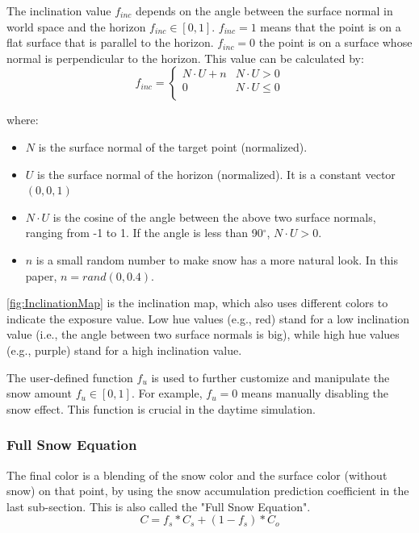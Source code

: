 \documentclass{article}
\begin{document}
The inclination value \( f_{inc} \) depends on the angle between the surface normal in world space and the
horizon \( f_{inc} \in [0, 1] \). \( f_{inc}=1 \) means that the point is on a flat surface that is parallel 
to the horizon. \( f_{inc}=0 \) the point is on a surface whose normal is perpendicular to the horizon. This
value can be calculated by:
\[
  f_{inc}=
  \left\{
    \begin{array}{ll}
      N \cdot U + n & N \cdot U > 0 \\
      0 & N \cdot U \leq 0 \\
    \end{array} 
  \right. 
\]

where:
\begin{itemize}
  \item \( N \) is the surface normal of the target point (normalized).
  \item \( U \) is the surface normal of the horizon (normalized). It is a constant vector \((0, 0, 1)\)
  \item \( N \cdot U \) is the cosine of the angle between the above two surface normals, ranging from 
  -1 to 1. If the angle is less than 90$^{\circ}$, \( N \cdot U > 0\).
  \item \( n \) is a small random number to make snow has a more natural look. In this paper, 
  \(n = rand(0, 0.4)\).
\end{itemize}

\ref{fig:InclinationMap} is the inclination map, which also uses different colors to indicate the exposure value. 
Low hue values (e.g., red) stand for a low inclination value (i.e., the angle between two surface normals is big),
while high hue values (e.g., purple) stand for a high inclination value.

The user-defined function \( f_{u} \) is used to further customize and manipulate the snow amount 
\( f_{u} \in [0, 1] \). For example, \( f_{u}=0 \) means manually disabling the snow effect. This function is crucial 
in the daytime simulation.

\subsubsection {Full Snow Equation}
The final color is a blending of the snow color and the surface color (without snow) on that point, by using the snow
accumulation prediction coefficient in the last sub-section. This is also called the "Full Snow Equation".
\[
  C = f_{s} * C_{s} + (1-f_{s}) * C_{o}
\]
\end{document}
